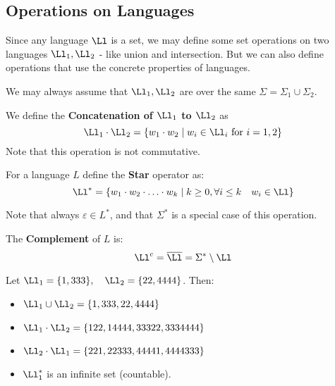 \subsection{Operations on Languages}
Since any language $\Ll$ is a set, we may define some set operations on two languages $\Ll_1, \Ll_2$ - like union and intersection. But we can also define operations that use the concrete properties of languages.
\begin{remark}
	We may always assume that $\Ll_1, \Ll_2$ are over the same $\Sigma = \Sigma_1 \cup \Sigma_2$.
\end{remark}
\begin{yellowBox}
	\begin{defn}[Concatenation] We define the \textbf{Concatenation of 
			$\Ll_1$ to $\Ll_2$} as
		$$ \Ll_1 \cdot \Ll_2 = \{w_1 \cdot w_2 \mid w_i\in \Ll_i \text{ for } i=1,2\}$$
		Note that this operation is not commutative.
	\end{defn}
	\begin{defn}
		[Star] For a language $L$ define the \textbf{Star} operator as:
		$$ \Ll^* = \{ w_1 \cdot w_2 \cdot \ldots \cdot w_k \mid k\geq 0, \forall i\leq k \quad w_i\in \Ll \}$$
	\end{defn}
\end{yellowBox}
\begin{remark}
	Note that always $\varepsilon\in L^*$, and that $\Sigma^*$ is a special case of this operation.
\end{remark}
\begin{yellowBox}
	
	\begin{defn}
		[Complement] The \textbf{Complement} of $L$ is:
		$$ \Ll^c = \overline{\Ll} = \Sigma^* \setminus \Ll$$
	\end{defn}
\end{yellowBox}
\begin{example}
	Let $\Ll_1 = \{1, 333\},\quad \Ll_2 = \{22,4444\}$. Then:
	\begin{itemize}
		\item $\Ll_1 \cup \Ll_2 = \{1,333,22,4444\}$
		\item $\Ll_1 \cdot \Ll_2 = \{122,14444,33322,3334444\}$
		\item $\Ll_2 \cdot \Ll_1 = \{221,22333,44441,4444333\}$
		\item $\Ll_1^*$ is an infinite set (countable).
	\end{itemize}
\end{example}

